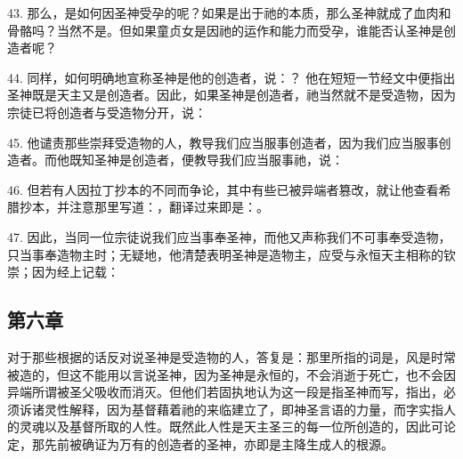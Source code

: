 43. 那么，是如何因圣神受孕的呢？如果是出于祂的本质，那么圣神就成了血肉和骨骼吗？当然不是。但如果童贞女是因祂的运作和能力而受孕，谁能否认圣神是创造者呢？\par

44. 同样，如何明确地宣称圣神是他的创造者，说：？ 他在短短一节经文中便指出圣神既是天主又是创造者。因此，如果圣神是创造者，祂当然就不是受造物，因为宗徒已将创造者与受造物分开，说：\par

45. 他谴责那些崇拜受造物的人，教导我们应当服事创造者，因为我们应当服事创造者。而他既知圣神是创造者，便教导我们应当服事祂，说：\par

46. 但若有人因拉丁抄本的不同而争论，其中有些已被异端者篡改，就让他查看希腊抄本，并注意那里写道：，翻译过来即是：。\par

47. 因此，当同一位宗徒说我们应当事奉圣神，而他又声称我们不可事奉受造物，只当事奉造物主时；无疑地，他清楚表明圣神是造物主，应受与永恒天主相称的钦崇；因为经上记载：\par


\subsection{第六章}

对于那些根据的话反对说圣神是受造物的人，答复是：那里所指的词是，风是时常被造的，但这不能用以言说圣神，因为圣神是永恒的，不会消逝于死亡，也不会因异端所谓被圣父吸收而消灭。但他们若固执地认为这一段是指圣神而写，指出，必须诉诸灵性解释，因为基督藉着祂的来临建立了，即神圣言语的力量，而字实指人的灵魂以及基督所取的人性。既然此人性是天主圣三的每一位所创造的，因此可论定，那先前被确证为万有的创造者的圣神，亦即是主降生成人的根源。\par

